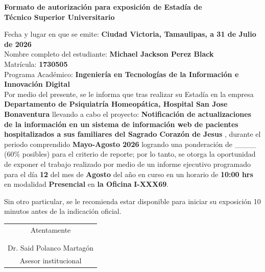 \documentclass[12pt]{article}
\newcommand{\NombreAlumno}{Michael Jackson Perez Black}
\newcommand{\NombreProyecto}{Notificación de actualizaciones de la información en un sistema de información web de pacientes hospitalizados a sus familiares del Sagrado Corazón de Jesus }
\newcommand{\UnidadEconomica}{Departamento de Psiquiatría Homeopática, Hospital San Jose Bonaventura}
\newcommand{\nasesorinstitucional}{Dr. Said Polanco Martagón}
\newcommand{\Matricula}           {1730505}  %
\newcommand{\ncuatrimestre}{Mayo-Agosto 2026}
\newcommand{\fechaAutorizacionInforme}               {31 de Julio de 2026}
\newcommand{\DiaEvaluacionPesentacion}{12}
\newcommand{\MesEvaluacionPesentacion}{Agosto}
\newcommand{\HoraEvaluacionPesentacion}{10:00 hrs}
\newcommand{\modalidadEvaluacionPesentacion}{Presencial} %
\newcommand{\tipoAulaOficinaEnlacePesentacion}{la Oficina} %
\newcommand{\AulaEvaluacionOEnlaceMeetPesentacion}{I-XXX69} %
\newcommand{\ncarrera}            {Ingeniería en Tecnologías de la Información e Innovación Digital}
\begin{document}
\begin{center}
{\Large \textbf{Formato de autorización para exposición de Estadía de}}\\[0.125cm]
{\Large \textbf{Técnico Superior Universitario}}\\[0.25cm]
\end{center}

\noindent
Fecha y lugar en que se emite: \textbf{Ciudad Victoria, Tamaulipas, a \fechaAutorizacionInforme } \\[0.125cm]
Nombre completo del estudiante: \textbf{\NombreAlumno} \\[0.125cm]
Matrícula: \textbf{\Matricula}  \\[0.125cm]
Programa Académico: \textbf{\ncarrera}  \\[0.25cm]

\noindent
Por medio del presente, se le informa que tras realizar su Estadía en la empresa \textbf{\UnidadEconomica} llevando a cabo el proyecto: \textbf{\NombreProyecto}, durante el periodo comprendido \textbf{\ncuatrimestre} logrando una ponderación de \_\_\_\_  (60\% posibles) para el criterio de reporte; por lo tanto, se otorga la oportunidad de exponer el trabajo realizado por medio de un informe ejecutivo programado para el día \textbf{\DiaEvaluacionPesentacion} del mes de \textbf{\MesEvaluacionPesentacion} del año en curso en un horario de \textbf{\HoraEvaluacionPesentacion} en modalidad \textbf{\modalidadEvaluacionPesentacion} en \textbf{\tipoAulaOficinaEnlacePesentacion} \textbf{\AulaEvaluacionOEnlaceMeetPesentacion}.

\vspace{0.25cm}

\noindent
Sin otro particular, se le recomienda estar disponible para iniciar su exposición 10 minutos antes de la indicación oficial.

\vspace{0.5cm}

\begin{center}
\begin{tabular}{p{10cm}}
\multicolumn{1}{c}{Atentamente}   \\
 \\
 \\ \hline
\multicolumn{1}{c}{\nasesorinstitucional}   \\
\multicolumn{1}{c}{Asesor institucional}   \\
\end{tabular}
\end{center}
\end{document}

